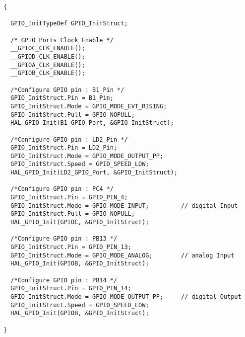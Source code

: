 \begin{lstlisting}[style=CStyle]
{ 

  GPIO_InitTypeDef GPIO_InitStruct; 
 
  /* GPIO Ports Clock Enable */ 
  __GPIOC_CLK_ENABLE(); 
  __GPIOD_CLK_ENABLE(); 
  __GPIOA_CLK_ENABLE(); 
  __GPIOB_CLK_ENABLE(); 
 
  /*Configure GPIO pin : B1_Pin */ 
  GPIO_InitStruct.Pin = B1_Pin; 
  GPIO_InitStruct.Mode = GPIO_MODE_EVT_RISING; 
  GPIO_InitStruct.Pull = GPIO_NOPULL; 
  HAL_GPIO_Init(B1_GPIO_Port, &GPIO_InitStruct); 
 
  /*Configure GPIO pin : LD2_Pin */ 
  GPIO_InitStruct.Pin = LD2_Pin; 
  GPIO_InitStruct.Mode = GPIO_MODE_OUTPUT_PP; 
  GPIO_InitStruct.Speed = GPIO_SPEED_LOW; 
  HAL_GPIO_Init(LD2_GPIO_Port, &GPIO_InitStruct); 
 
  /*Configure GPIO pin : PC4 */ 
  GPIO_InitStruct.Pin = GPIO_PIN_4; 
  GPIO_InitStruct.Mode = GPIO_MODE_INPUT;         // digital Input 
  GPIO_InitStruct.Pull = GPIO_NOPULL; 
  HAL_GPIO_Init(GPIOC, &GPIO_InitStruct); 
 
  /*Configure GPIO pin : PB13 */ 
  GPIO_InitStruct.Pin = GPIO_PIN_13; 
  GPIO_InitStruct.Mode = GPIO_MODE_ANALOG;        // analog Input 
  HAL_GPIO_Init(GPIOB, &GPIO_InitStruct); 
 
  /*Configure GPIO pin : PB14 */ 
  GPIO_InitStruct.Pin = GPIO_PIN_14; 
  GPIO_InitStruct.Mode = GPIO_MODE_OUTPUT_PP;     // digital Output 
  GPIO_InitStruct.Speed = GPIO_SPEED_LOW; 
  HAL_GPIO_Init(GPIOB, &GPIO_InitStruct); 
 
}
\end{lstlisting}


